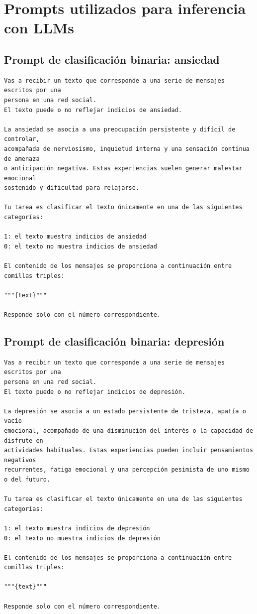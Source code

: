 \chapter{Prompts utilizados para inferencia con LLMs}
\label{anexo:prompts_llm}

\section{Prompt de clasificación binaria: ansiedad}

\begin{lstlisting}[style=promptstyle]
Vas a recibir un texto que corresponde a una serie de mensajes escritos por una 
persona en una red social.
El texto puede o no reflejar indicios de ansiedad.

La ansiedad se asocia a una preocupación persistente y difícil de controlar, 
acompañada de nerviosismo, inquietud interna y una sensación continua de amenaza 
o anticipación negativa. Estas experiencias suelen generar malestar emocional 
sostenido y dificultad para relajarse.

Tu tarea es clasificar el texto únicamente en una de las siguientes categorías:

1: el texto muestra indicios de ansiedad
0: el texto no muestra indicios de ansiedad

El contenido de los mensajes se proporciona a continuación entre comillas triples:

"""{text}"""

Responde solo con el número correspondiente.
\end{lstlisting}


\section{Prompt de clasificación binaria: depresión}

\begin{lstlisting}[style=promptstyle]
Vas a recibir un texto que corresponde a una serie de mensajes escritos por una 
persona en una red social.
El texto puede o no reflejar indicios de depresión.

La depresión se asocia a un estado persistente de tristeza, apatía o vacío 
emocional, acompañado de una disminución del interés o la capacidad de disfrute en 
actividades habituales. Estas experiencias pueden incluir pensamientos negativos 
recurrentes, fatiga emocional y una percepción pesimista de uno mismo o del futuro.

Tu tarea es clasificar el texto únicamente en una de las siguientes categorías:

1: el texto muestra indicios de depresión
0: el texto no muestra indicios de depresión

El contenido de los mensajes se proporciona a continuación entre comillas triples:

"""{text}"""

Responde solo con el número correspondiente.
\end{lstlisting}


